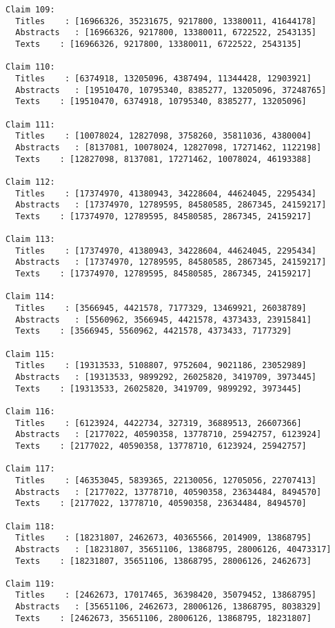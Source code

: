 \documentclass[11pt]{article}
\begin{document}
\begin{Verbatim}[commandchars=\\\{\}]
Claim 109:
  Titles    : [16966326, 35231675, 9217800, 13380011, 41644178]
  Abstracts   : [16966326, 9217800, 13380011, 6722522, 2543135]
  Texts    : [16966326, 9217800, 13380011, 6722522, 2543135]

Claim 110:
  Titles    : [6374918, 13205096, 4387494, 11344428, 12903921]
  Abstracts   : [19510470, 10795340, 8385277, 13205096, 37248765]
  Texts    : [19510470, 6374918, 10795340, 8385277, 13205096]

Claim 111:
  Titles    : [10078024, 12827098, 3758260, 35811036, 4380004]
  Abstracts   : [8137081, 10078024, 12827098, 17271462, 1122198]
  Texts    : [12827098, 8137081, 17271462, 10078024, 46193388]

Claim 112:
  Titles    : [17374970, 41380943, 34228604, 44624045, 2295434]
  Abstracts   : [17374970, 12789595, 84580585, 2867345, 24159217]
  Texts    : [17374970, 12789595, 84580585, 2867345, 24159217]

Claim 113:
  Titles    : [17374970, 41380943, 34228604, 44624045, 2295434]
  Abstracts   : [17374970, 12789595, 84580585, 2867345, 24159217]
  Texts    : [17374970, 12789595, 84580585, 2867345, 24159217]

Claim 114:
  Titles    : [3566945, 4421578, 7177329, 13469921, 26038789]
  Abstracts   : [5560962, 3566945, 4421578, 4373433, 23915841]
  Texts    : [3566945, 5560962, 4421578, 4373433, 7177329]

Claim 115:
  Titles    : [19313533, 5108807, 9752604, 9021186, 23052989]
  Abstracts   : [19313533, 9899292, 26025820, 3419709, 3973445]
  Texts    : [19313533, 26025820, 3419709, 9899292, 3973445]

Claim 116:
  Titles    : [6123924, 4422734, 327319, 36889513, 26607366]
  Abstracts   : [2177022, 40590358, 13778710, 25942757, 6123924]
  Texts    : [2177022, 40590358, 13778710, 6123924, 25942757]

Claim 117:
  Titles    : [46353045, 5839365, 22130056, 12705056, 22707413]
  Abstracts   : [2177022, 13778710, 40590358, 23634484, 8494570]
  Texts    : [2177022, 13778710, 40590358, 23634484, 8494570]

Claim 118:
  Titles    : [18231807, 2462673, 40365566, 2014909, 13868795]
  Abstracts   : [18231807, 35651106, 13868795, 28006126, 40473317]
  Texts    : [18231807, 35651106, 13868795, 28006126, 2462673]

Claim 119:
  Titles    : [2462673, 17017465, 36398420, 35079452, 13868795]
  Abstracts   : [35651106, 2462673, 28006126, 13868795, 8038329]
  Texts    : [2462673, 35651106, 28006126, 13868795, 18231807]


\end{Verbatim}
\end{document}
